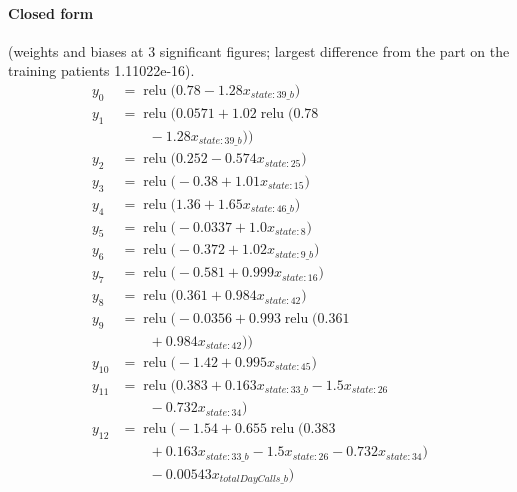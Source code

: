 \documentclass[a4paper,10pt]{article}
\newif\ifreviewmarks
\newcommand{\reviewrule}{\noindent{\color{BrickRed}\rule{\linewidth}{0.8pt}}}
\newenvironment{drafted}[1][]{%
  \ifreviewmarks\par\addvspace{\medskipamount}\reviewrule\par\nopagebreak
  \noindent{\color{BrickRed}\sffamily\footnotesize\textbf{Thesis Draft}\quad #1\hfill review}\par\nopagebreak\smallskip\fi}{%
  \ifreviewmarks\par\smallskip\noindent{\color{BrickRed}\sffamily\footnotesize end of thesis draft}\par\nopagebreak\reviewrule\par\medskip\fi}
\begin{document}
\begin{drafted}[plain-language layer: churn100-s4-c3]
\paragraph{Closed form} {\footnotesize(weights and biases at 3 significant figures; largest difference from the part on the training patients 1.11022e-16).}
{\small\begingroup\allowdisplaybreaks
\begin{align*}
y_{0} &= \operatorname{relu}\bigl(0.78 - 1.28 x_{state:39\_b}\bigr) \\
y_{1} &= \operatorname{relu}\bigl(0.0571 + 1.02 \operatorname{relu}\bigl(0.78 \\
&\qquad - 1.28 x_{state:39\_b}\bigr)\bigr) \\
y_{2} &= \operatorname{relu}\bigl(0.252 - 0.574 x_{state:25}\bigr) \\
y_{3} &= \operatorname{relu}\bigl(-0.38 + 1.01 x_{state:15}\bigr) \\
y_{4} &= \operatorname{relu}\bigl(1.36 + 1.65 x_{state:46\_b}\bigr) \\
y_{5} &= \operatorname{relu}\bigl(-0.0337 + 1.0 x_{state:8}\bigr) \\
y_{6} &= \operatorname{relu}\bigl(-0.372 + 1.02 x_{state:9\_b}\bigr) \\
y_{7} &= \operatorname{relu}\bigl(-0.581 + 0.999 x_{state:16}\bigr) \\
y_{8} &= \operatorname{relu}\bigl(0.361 + 0.984 x_{state:42}\bigr) \\
y_{9} &= \operatorname{relu}\bigl(-0.0356 + 0.993 \operatorname{relu}\bigl(0.361 \\
&\qquad + 0.984 x_{state:42}\bigr)\bigr) \\
y_{10} &= \operatorname{relu}\bigl(-1.42 + 0.995 x_{state:45}\bigr) \\
y_{11} &= \operatorname{relu}\bigl(0.383 + 0.163 x_{state:33\_b} - 1.5 x_{state:26} \\
&\qquad - 0.732 x_{state:34}\bigr) \\
y_{12} &= \operatorname{relu}\bigl(-1.54 + 0.655 \operatorname{relu}\bigl(0.383 \\
&\qquad + 0.163 x_{state:33\_b} - 1.5 x_{state:26} - 0.732 x_{state:34}\bigr) \\
&\qquad - 0.00543 x_{totalDayCalls\_b}\bigr)
\end{align*}\endgroup}


\end{drafted}
\end{document}
